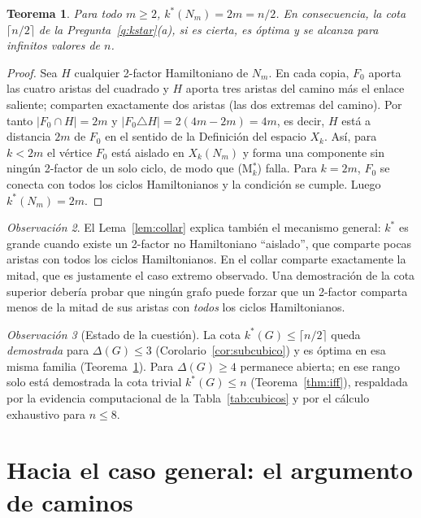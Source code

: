 \documentclass[11pt,a4paper]{article}
\newtheorem{teorema}{Teorema}[section]
\theoremstyle{definition}
\theoremstyle{remark}
\newtheorem{observacion}[teorema]{Observación}
\begin{document}
\begin{teorema}\label{thm:collar}
Para todo $m\ge2$, $k^*(N_m)=2m=n/2$. En consecuencia, la cota $\lceil n/2\rceil$ de la Pregunta~\ref{q:kstar}(a), si es cierta, es óptima y se alcanza para infinitos valores de $n$.
\end{teorema}

\begin{proof}
Sea $H$ cualquier 2-factor Hamiltoniano de $N_m$. En cada copia, $F_0$ aporta las cuatro aristas del cuadrado y $H$ aporta tres aristas del camino más el enlace saliente; comparten exactamente dos aristas (las dos extremas del camino). Por tanto $|F_0\cap H|=2m$ y $|F_0\triangle H|=2(4m-2m)=4m$, es decir, $H$ está a distancia $2m$ de $F_0$ en el sentido de la Definición del espacio $X_k$.
Así, para $k<2m$ el vértice $F_0$ está aislado en $X_k(N_m)$ y forma una componente sin ningún 2-factor de un solo ciclo, de modo que (M$^*_k$) falla. Para $k=2m$, $F_0$ se conecta con todos los ciclos Hamiltonianos y la condición se cumple. Luego $k^*(N_m)=2m$.
\end{proof}

\begin{observacion}
El Lema~\ref{lem:collar} explica también el mecanismo general: $k^*$ es grande cuando existe un 2-factor no Hamiltoniano ``aislado'', que comparte pocas aristas con todos los ciclos Hamiltonianos. En el collar comparte exactamente la mitad, que es justamente el caso extremo observado. Una demostración de la cota superior debería probar que ningún grafo puede forzar que un 2-factor comparta menos de la mitad de sus aristas con \emph{todos} los ciclos Hamiltonianos.
\end{observacion}

\begin{observacion}[Estado de la cuestión]
La cota $k^*(G)\le\lceil n/2\rceil$ queda \emph{demostrada} para $\Delta(G)\le3$ (Corolario~\ref{cor:subcubico}) y es óptima en esa misma familia (Teorema~\ref{thm:collar}). Para $\Delta(G)\ge4$ permanece abierta; en ese rango solo está demostrada la cota trivial $k^*(G)\le n$ (Teorema~\ref{thm:iff}), respaldada por la evidencia computacional de la Tabla~\ref{tab:cubicos} y por el cálculo exhaustivo para $n\le8$.
\end{observacion}


\section{Hacia el caso general: el argumento de caminos}\label{sec:caminos}
\end{document}

